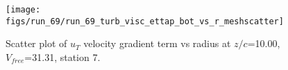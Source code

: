 \begin{figure}[H]
\centering
\texttt{[image: figs/run\_69/run\_69\_turb\_visc\_ettap\_bot\_vs\_r\_meshscatter]}
\caption{Scatter plot of $
u_T$ velocity gradient term vs radius at $z/c$=10.00, $V_{free}$=31.31, station 7.}
\end{figure}


